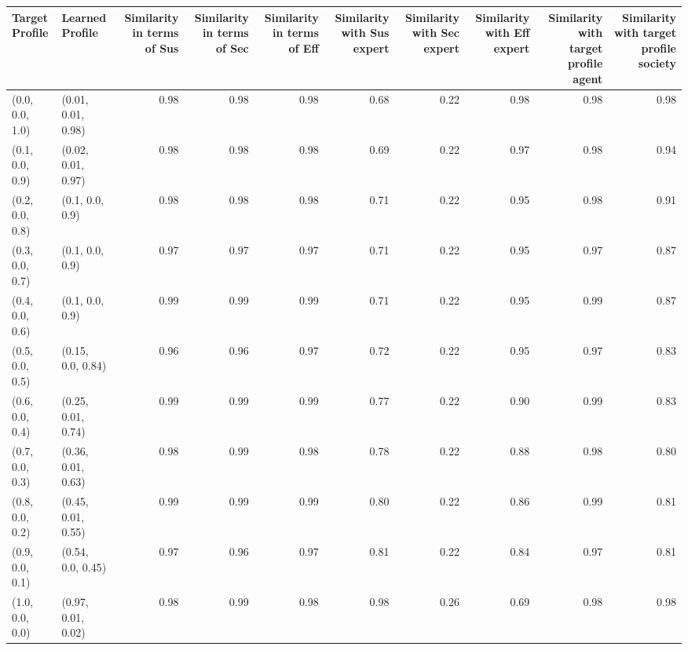 \begin{tabular}{llrrrrrrrr}
\toprule
Target Profile & Learned Profile & Similarity in terms of Sus & Similarity in terms of Sec & Similarity in terms of Eff & Similarity with Sus expert & Similarity with Sec expert & Similarity with Eff expert & Similarity with target profile agent & Similarity with target profile society \\
\midrule
(0.0, 0.0, 1.0) & (0.01, 0.01, 0.98) & 0.98 & 0.98 & 0.98 & 0.68 & 0.22 & 0.98 & 0.98 & 0.98 \\
(0.1, 0.0, 0.9) & (0.02, 0.01, 0.97) & 0.98 & 0.98 & 0.98 & 0.69 & 0.22 & 0.97 & 0.98 & 0.94 \\
(0.2, 0.0, 0.8) & (0.1, 0.0, 0.9) & 0.98 & 0.98 & 0.98 & 0.71 & 0.22 & 0.95 & 0.98 & 0.91 \\
(0.3, 0.0, 0.7) & (0.1, 0.0, 0.9) & 0.97 & 0.97 & 0.97 & 0.71 & 0.22 & 0.95 & 0.97 & 0.87 \\
(0.4, 0.0, 0.6) & (0.1, 0.0, 0.9) & 0.99 & 0.99 & 0.99 & 0.71 & 0.22 & 0.95 & 0.99 & 0.87 \\
(0.5, 0.0, 0.5) & (0.15, 0.0, 0.84) & 0.96 & 0.96 & 0.97 & 0.72 & 0.22 & 0.95 & 0.97 & 0.83 \\
(0.6, 0.0, 0.4) & (0.25, 0.01, 0.74) & 0.99 & 0.99 & 0.99 & 0.77 & 0.22 & 0.90 & 0.99 & 0.83 \\
(0.7, 0.0, 0.3) & (0.36, 0.01, 0.63) & 0.98 & 0.99 & 0.98 & 0.78 & 0.22 & 0.88 & 0.98 & 0.80 \\
(0.8, 0.0, 0.2) & (0.45, 0.01, 0.55) & 0.99 & 0.99 & 0.99 & 0.80 & 0.22 & 0.86 & 0.99 & 0.81 \\
(0.9, 0.0, 0.1) & (0.54, 0.0, 0.45) & 0.97 & 0.96 & 0.97 & 0.81 & 0.22 & 0.84 & 0.97 & 0.81 \\
(1.0, 0.0, 0.0) & (0.97, 0.01, 0.02) & 0.98 & 0.99 & 0.98 & 0.98 & 0.26 & 0.69 & 0.98 & 0.98 \\
\bottomrule
\end{tabular}
